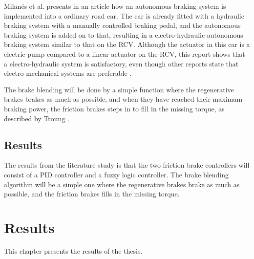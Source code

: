 \documentclass[a4paper,11pt]{kth-mag}
\begin{document}
Milan{\'e}s et al. \cite{milanes2010electro} presents in an article how an autonomous braking system is implemented into a ordinary road car. The car is already fitted with a hydraulic braking system with a manually controlled braking pedal, and the autonomous braking system is added on to that, resulting in a electro-hydraulic autonomous braking system similar to that on the RCV. 
Although the actuator in this car is a electric pump compared to a linear actuator on the RCV, this report shows that a electro-hydraulic system is satisfactory, even though other reports state that electro-mechanical systems are preferable \cite{MechatronicsBook} \cite{Xiang}. \newline

The brake blending will be done by a simple function where the regenerative brakes brakes as much as possible, and when they have reached their maximum braking power, the friction brakes steps in to fill in the missing torque, as described by Troung \cite{truongdevelopment}. \newline


\section*{Results}
The results from the literature study is that the two friction brake controllers will consist of a PID controller and a fuzzy logic controller. 
The brake blending algorithm will be a simple one where the regenerative brakes brake as much as possible, and the friction brakes fills in the missing torque. 



\chapter{Results}
This chapter presents the results of the thesis.
\end{document}
